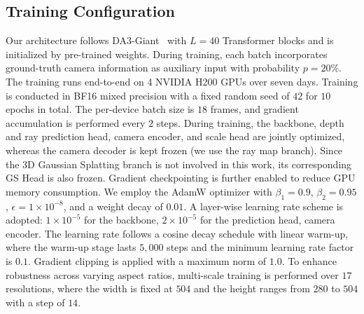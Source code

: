 \subsection{Training Configuration}
Our \ours architecture follows DA3-Giant~\citep{lin2025depth} with $L = 40$ Transformer blocks and is initialized by pre-trained weights.
%
During training, each batch incorporates ground-truth camera information as auxiliary input with probability $p=20\%$.
%
The training runs end-to-end on 4 NVIDIA H200 GPUs over seven days.
%
Training is conducted in BF16 mixed precision with a fixed random seed of $42$ for $10$ epochs in total. 
%
The per-device batch size is $18$ frames, and gradient accumulation is performed every $2$ steps.
%
During training, the backbone, depth and ray prediction head, camera encoder, and scale head are jointly optimized, whereas the camera decoder is kept frozen (we use the ray map branch).
%
Since the 3D Gaussian Splatting branch is not involved in this work, its corresponding GS Head is also frozen.
%
Gradient checkpointing is further enabled to reduce GPU memory consumption.
%
We employ the AdamW optimizer with $\beta_1 = 0.9$, $\beta_2 = 0.95$, $\epsilon = 1 \times 10^{-8}$, and a weight decay of $0.01$. A layer-wise learning rate scheme is adopted: $1 \times 10^{-5}$ for the backbone, $2 \times 10^{-5}$ for the prediction head, camera encoder. 
%
The learning rate follows a cosine decay schedule with linear warm-up, where the warm-up stage lasts $5{,}000$ steps and the minimum learning rate factor is $0.1$. Gradient clipping is applied with a maximum norm of $1.0$.
%
To enhance robustness across varying aspect ratios, multi-scale training is performed
over $17$ resolutions, where the width is fixed at $504$ and the height ranges
from $280$ to $504$ with a step of $14$.

